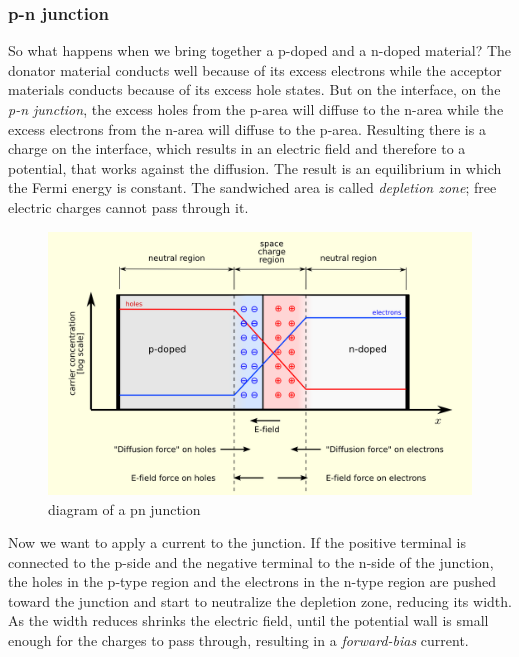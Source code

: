 \documentclass[11pt]{article}
\begin{document}
\subsubsection{p-n junction}
So what happens when we bring together a p-doped and a n-doped material? The donator material conducts well because of its excess electrons while the acceptor materials conducts because of its excess hole states. But on the interface, on the \textit{p-n junction}, the excess holes from the p-area will diffuse to the n-area while the excess electrons from the n-area will diffuse to the p-area. Resulting there is a charge on the interface, which results in an electric field and therefore to a potential, that works against the diffusion. The result is an equilibrium in which the Fermi energy is constant. The sandwiched area is called \textit{depletion zone}; free electric charges cannot pass through it. 

\begin{figure}[H]
\centering
\includegraphics[width=1.0\textwidth]{pn_junction}%
\caption{diagram of a pn junction}
\label{fig:pn_junction}
\end{figure}

Now we want to apply a current to the junction. If the positive terminal is connected to the p-side and the negative terminal to the n-side of the junction, the holes in the p-type region and the electrons in the n-type region are pushed toward the junction and start to neutralize the depletion zone, reducing its width. As the width reduces shrinks the electric field, until the potential wall is small enough for the charges to pass through, resulting in a \textit{forward-bias} current. 
\end{document}
